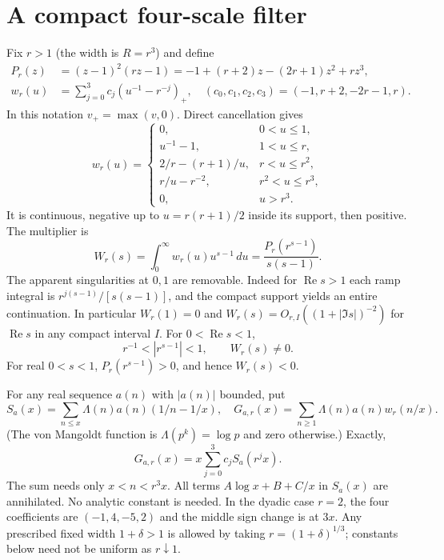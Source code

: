 \documentclass[11pt]{article}
\theoremstyle{remark}\newtheorem{remark}[theorem]{Remark}
\newcommand{\Rea}{\operatorname{Re}}
\newcommand{\pp}[1]{\left(#1\right)_+}
\begin{document}
\section{A compact four-scale filter}
Fix $r>1$ (the width is $R=r^3$) and define
\begin{align*}
 P_r(z)&=(z-1)^2(rz-1)=-1+(r+2)z-(2r+1)z^2+rz^3,\\
 w_r(u)&=\sum_{j=0}^3 c_j\pp{u^{-1}-r^{-j}},\quad (c_0,c_1,c_2,c_3)=(-1,r+2,-2r-1,r).
\end{align*}
In this notation $v_+=\max(v,0)$. Direct cancellation gives
\begin{equation}\label{kernel}
 w_r(u)=\begin{cases}
 0,&0<u\le1,\\
 u^{-1}-1,&1<u\le r,\\
 2/r-(r+1)/u,&r<u\le r^2,\\
 r/u-r^{-2},&r^2<u\le r^3,\\
 0,&u>r^3.
 \end{cases}
\end{equation}
It is continuous, negative up to $u=r(r+1)/2$ inside its support, then positive. The multiplier is
\begin{equation}\label{W}
 W_r(s)=\int_0^\infty w_r(u)u^{s-1}\,du
       =\frac{P_r(r^{s-1})}{s(s-1)}.
\end{equation}
The apparent singularities at $0,1$ are removable. Indeed for $\Rea s>1$ each ramp integral is $r^{j(s-1)}/[s(s-1)]$, and the compact support yields an entire continuation. In particular $W_r(1)=0$ and $W_r(s)=O_{r,I}((1+|\Im s|)^{-2})$ for $\Rea s$ in any compact interval $I$. For $0<\Rea s<1$,
\begin{equation}\label{nonzero}
 r^{-1}<|r^{s-1}|<1,\qquad W_r(s)\ne0.
\end{equation}
For real $0<s<1$, $P_r(r^{s-1})>0$, and hence $W_r(s)<0$.

For any real sequence $a(n)$ with $|a(n)|$ bounded, put
\[
 S_a(x)=\sum_{n\le x}\Lambda(n)a(n)(1/n-1/x),\quad
 G_{a,r}(x)=\sum_{n\ge1}\Lambda(n)a(n)w_r(n/x).
\]
(The von Mangoldt function is $\Lambda(p^k)=\log p$ and zero otherwise.) Exactly,
\begin{equation}\label{dilation}
 G_{a,r}(x)=x\sum_{j=0}^3 c_j S_a(r^j x).
\end{equation}
The sum needs only $x<n<r^3x$. All terms $A\log x+B+C/x$ in $S_a(x)$ are annihilated. No analytic constant is needed. In the dyadic case $r=2$, the four coefficients are $(-1,4,-5,2)$ and the middle sign change is at $3x$. Any prescribed fixed width $1+\delta>1$ is allowed by taking $r=(1+\delta)^{1/3}$; constants below need not be uniform as $r\downarrow1$.
\end{document}
